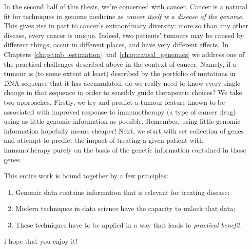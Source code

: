 \documentclass[../thesis.tex]{subfiles}
\begin{document}
In the second half of this thesis, we're concerned with cancer. Cancer is a natural fit for techniques in genome medicine as \emph{cancer itself is a disease of the genome}. This gives rise in part to cancer's extraordinary diversity: more so than any other disease, every cancer is unique. Indeed, two patients’ tumours may be caused by different things, occur in different places, and have very different effects. In Chapters~\ref{chap:tmb_estimation}~and~\ref{chap:causal_genomics} we address one of the practical challenges described above in the context of cancer. Namely, if a tumour is (to some extent at least) described by the portfolio of mutations in DNA sequence that it has accumulated, do we really need to know every single change in that sequence in order to sensibly guide therapeutic choices? We take two approaches. Firstly, we try and predict a tumour feature known to be associated with improved response to immunotherapy (a type of cancer drug) using as little genomic information as possible. Remember, using little genomic information hopefully means cheaper! Next, we start with set collection of genes and attempt to predict the impact of treating a given patient with immunotherapy purely on the basis of the genetic information contained in those genes.

This entire work is bound together by a few principles:
\begin{enumerate}
    \item Genomic data contains information that is relevant for treating disease;
    \item Modern techniques in data science have the capacity to unlock that data;
    \item These techniques have to be applied in a way that leads to \emph{practical benefit}.
\end{enumerate}
I hope that you enjoy it!

\end{document}
